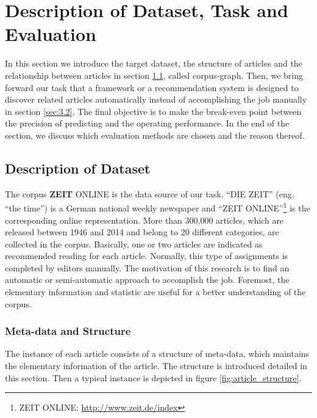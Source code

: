 \section{Description of Dataset, Task and Evaluation}
\label{sec:3}

In this section we introduce the target dataset, the structure of articles and the relationship between articles in section \ref{sec:3.1}, called corpus-graph. Then, we bring forward our task that a framework or a recommendation system is designed to discover related articles automatically instead of accomplishing the job manually in section \ref{sec:3.2}. The final objective is to make the break-even point between the precision of predicting and the operating performance. In the end of the section, we discuss which evaluation methods are chosen and the reason thereof. 

\bigbreak
\subsection{Description of Dataset}
\label{sec:3.1}

The corpus \textbf{ZEIT} ONLINE is the data source of our task. ``DIE ZEIT'' (eng. ``the time'') is a German national weekly newspaper and ``ZEIT ONLINE''\footnote{ZEIT ONLINE: \url{http://www.zeit.de/index}} is the corresponding online representation. More than 300,000 articles, which are released between 1946 and 2014 and belong to 20 different categories, are collected in the corpus. Basically, one or two articles are indicated as recommended reading for each article. Normally, this type of assignments is completed by editors manually. The motivation of this research is to find an automatic or semi-automatic approach to accomplish the job. Foremost, the elementary information and statistic are useful for a better understanding of the corpus. 

\subsubsection{Meta-data and Structure}
\label{sec:3structure}

The instance of each article consists of a structure of meta-data, which maintains the elementary information of the article. The structure is introduced detailed in this section. Then a typical instance is depicted in figure \ref{fig:article_structure}.

